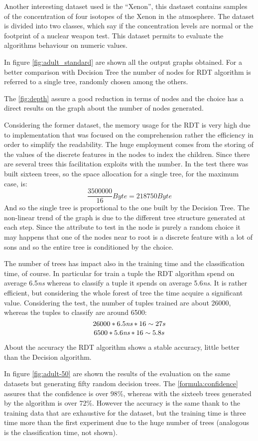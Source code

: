 \documentclass{acm_proc_article-sp-sigmod07}
\begin{document}
Another interesting dataset used is the ``Xenon'', this dastaset contains
samples of the concentration of four isotopes of the Xenon in the
atmosphere. The dataset is divided into two classes, which say if the
concentration levels are normal or the footprint of a nuclear weapon test.
This dataset permits to evaluate the algorithms behaviour on numeric
values.

In figure \ref{fig:adult_standard} are shown all the output graphs
obtained.  For a better comparison with Decision Tree the number of nodes
for RDT algorithm is referred to a single tree, randomly chosen among the
others.

The \ref{fig:depth} assure a good reduction in terms of nodes and the
choice has a direct results on the graph about the number of nodes
generated.

Considering the former dataset, the memory usage for the RDT is very high
due to implementation that was focused on the comprehension rather the
efficiency in order to simplify the readability. The huge employment comes
from the storing of the values of the discrete features in the nodes to
index the children. Since there are several trees this facilitation
exploits with the number. In the test there was built sixteen trees, so the
space allocation for a single tree, for the maximum case, is:
$$ \frac{3500000}{16} Byte = 218750 Byte$$
And so the single tree is proportional to the one built by the Decision
Tree. The non-linear trend of the graph is due to the different tree
structure generated at each step. Since the attribute to test in the node
is purely a random choice it may happens that one of the nodes near to
root is a discrete feature with a lot of sons and so the entire tree is
conditioned by the choice.

The number of trees has impact also in the training time and the
classification time, of course. In particular for train a tuple the RDT
algorithm spend on average 6.5\emph{ns} whereas to classify a tuple it
spends on average 5.6\emph{ns}. It is rather efficient, but considering
the whole forest of tree the time acquire a significant value. Considering
the test, the number of tuples trained are about 26000, whereas the tuples
to classify are around 6500:
$$
26000 * 6.5\emph{ns} * 16 \sim 27 s
$$
$$
 6500 * 5.6\emph{ns} * 16 \sim 5.8 s
$$

About the accuracy the RDT algorithm shows a stable accuracy, little
better than the Decision algorithm.

In figure \ref{fig:adult-50} are shown the results of the evaluation on
the same datasets but generating fifty random decision trees. The
\ref{formula:confidence} assures that the confidence is over 98\%, whereas
with the sixteeb trees generated  by the algorithm is over 72\%. However
the accuracy is the same thank to the training data that are exhaustive
for the dataset, but the training time is three time more than the first
experiment due to the huge number of trees (analogous is the
classification time, not shown).
\end{document}
